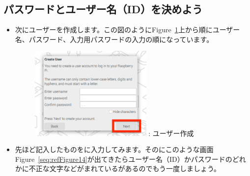 \documentclass[a4paper,12pt]{jarticle}
\begin{document}
\begin{enumerate}
  \subsection{\theExercise パスワードとユーザー名（ID）を決めよう}         
          
                \begin{itemize}
                \item                                      
                次にユーザーを作成します。この図のようにFigure~\ref{seq:refFigure11}上から順にユーザー名、パスワード、入力用パスワードの入力の順になっています。
              
        
                    \begin{figure}[h]
                      \centering
                      \begin{minipage}{5.228cm}
                        {\upshape
                          \includegraphics[width=6.000cm]{sw_image03.png}
                          \newline
                          {\theFigure\label{seq:refFigure11}}:
                          ユーザー作成}
                      \end{minipage}
                    \end{figure}
                  \end{itemize}
                  \begin{itemize}
                  \item
                      先ほど記入したものをに入力してみます。そのにこのような画面Figure~\ref{seq:refFigure14}が出てきたらユーザー名（ID）かパスワードのどれかに不正な文字などがまれているがあるのでもう一度しましょう。
                      \begin{figure}[h]
                        \centering
                        \begin{minipage}{5.228cm}
                          {\upshape
}
\end{minipage}
\end{figure}
\end{itemize}
\end{enumerate}
\end{document}
